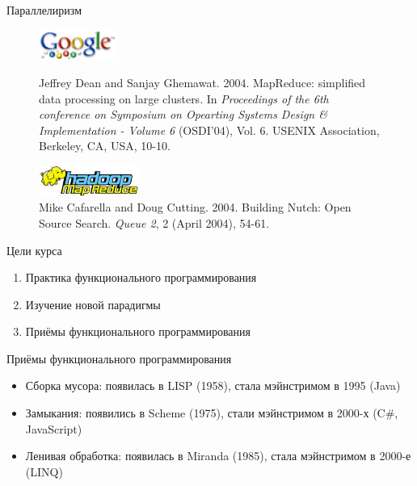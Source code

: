 \documentclass{beamer}
\begin{document}
\begin{frame}{Параллелиризм}
  \begin{figure}[h]
    \begin{minipage}[h]{1\linewidth}
      \begin{center}
        \includegraphics[height=10mm]{lecture0/GoogleLabs.eps}
        \caption{Jeffrey Dean and Sanjay Ghemawat. 2004. MapReduce: simplified data processing on large clusters. In \emph{Proceedings of the 6th conference on Symposium on Opearting Systems Design \& Implementation - Volume 6} (OSDI'04), Vol. 6. USENIX Association, Berkeley, CA, USA, 10-10.}
      \end{center}
    \end{minipage}
    \begin{minipage}[h]{1\linewidth}
      \begin{center}
        \includegraphics[height=10mm]{lecture0/HadoopMR.eps}
        \caption{Mike Cafarella and Doug Cutting. 2004. Building Nutch: Open Source Search. \emph{Queue 2}, 2 (April 2004), 54-61.}        
      \end{center}
    \end{minipage}
  \end{figure}
\end{frame}

\begin{frame}{Цели курса}
  \begin{enumerate}
  \item Практика функционального программирования
  \item Изучение новой парадигмы
  \item Приёмы функционального программирования
  \end{enumerate}
\end{frame}

\begin{frame}{Приёмы функционального программирования}
  \begin{itemize}
  \item Сборка мусора: появилась в LISP (1958), стала мэйнстримом в 1995
    (Java)\pause
  \item Замыкания: появились в Scheme (1975), стали мэйнстримом в 2000-х
    (C\#, JavaScript)\pause
  \item Ленивая обработка: появилась в Miranda (1985), стала мэйнстримом
    в 2000-е (LINQ)
  \end{itemize}
\end{frame}
\end{document}
